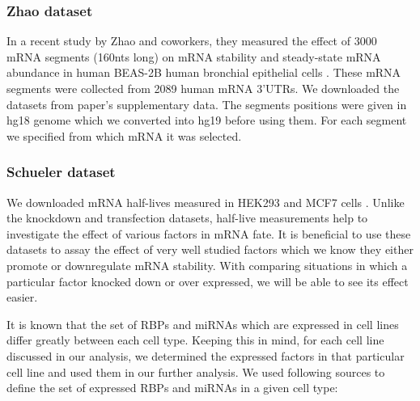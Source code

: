 \subsubsection{Zhao dataset} In a recent study by Zhao and coworkers, they measured the effect of 3000 mRNA segments (160nts long) on mRNA stability and steady-state mRNA abundance in human BEAS-2B human bronchial epithelial cells \cite{zhao_14}. These mRNA segments were collected from 2089 human mRNA 3'UTRs. We downloaded the datasets from paper's supplementary data. The segments positions were given in hg18 genome which we converted into hg19 before using them. For each segment we specified from which mRNA it was selected.

\subsubsection{Schueler dataset} We downloaded mRNA half-lives measured in HEK293 and MCF7 cells \cite{schueler_14}. Unlike the knockdown and transfection datasets, half-live measurements help to investigate the effect of various factors in mRNA fate. It is beneficial to use these datasets to assay the effect of very well studied factors which we know they either promote or downregulate mRNA stability. With comparing situations in which a particular factor knocked down or over expressed, we will be able to see its effect easier.

It is known that the set of RBPs and miRNAs which are expressed in cell lines differ greatly between each cell type. Keeping this in mind, for each cell line discussed in our analysis, we determined the expressed factors in that particular cell line and used them in our further analysis. We used following sources to define the set of expressed RBPs and miRNAs in a given cell type:

